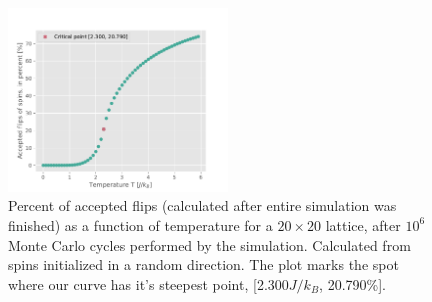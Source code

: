 \documentclass[10pt, nofootinbib, twocolumn]{revtex4-1}
\begin{document}
\newpage
\begin{figure}[H]
    \centering
    \includegraphics[width = 0.52\textwidth]{figures/20x20acceptflips_t_EXTRAASF.pdf} 
    \caption{Percent of accepted flips (calculated after entire simulation was finished) as a function of temperature for a $20\times 20$ lattice, after $10^6$ Monte Carlo cycles performed by the simulation. Calculated from spins initialized in a random direction. The plot marks the spot where our curve has it's steepest point, [2.300$J/k_B$, 20.790\%].}
    \label{fig:acceptedflips}
\end{figure} 
\end{document}

